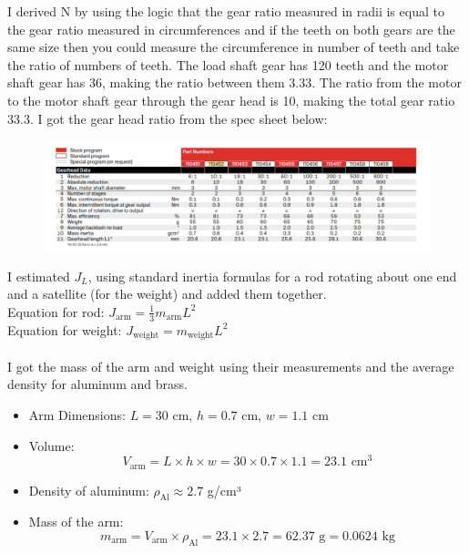 \documentclass{article}
\begin{document}
I derived N by using the logic that the gear ratio measured in radii is equal to the gear ratio measured in circumferences and if the teeth on both gears are the same size then you could measure the circumference in number of teeth and take the ratio of numbers of teeth.
The load shaft gear has 120 teeth and the motor shaft gear has 36, making the ratio between them 3.33.
The ratio from the motor to the motor shaft gear through the gear head is 10, making the total gear ratio 33.3.
I got the gear head ratio from the spec sheet below:

\begin{figure}[H]
    \centering
    \includegraphics[width=\textwidth]{gearHeadSpec.png}
\end{figure}

I estimated $J_L$, using standard inertia formulas for a rod rotating about one end and a satellite (for the weight) and added them together.
\\
Equation for rod:
$J_{\text{arm}} = \frac{1}{3} m_{\text{arm}} L^2$
\\
Equation for weight:
$J_{\text{weight}} = m_{\text{weight}} L^2$
\\
\\
I got the mass of the arm and weight using their measurements and the average density for aluminum and brass.
\begin{itemize}
    \item Arm Dimensions: \( L = 30 \) cm, \( h = 0.7 \) cm, \( w = 1.1 \) cm
    \item Volume:
    \begin{equation}
        V_{\text{arm}} = L \times h \times w = 30 \times 0.7 \times 1.1 = 23.1 \text{ cm}^3
    \end{equation}
    \item Density of aluminum: \( \rho_{\text{Al}} \approx 2.7 \) g/cm³
    \item Mass of the arm:
    \begin{equation}
        m_{\text{arm}} = V_{\text{arm}} \times \rho_{\text{Al}} = 23.1 \times 2.7 = 62.37 \text{ g} = 0.0624 \text{ kg}
    \end{equation}
\end{itemize}
\end{document}
